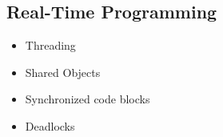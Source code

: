 \subsection{Real-Time Programming}
\begin{itemize}
    \item Threading
    \item Shared Objects
    \item Synchronized code blocks
    \item Deadlocks
\end{itemize}